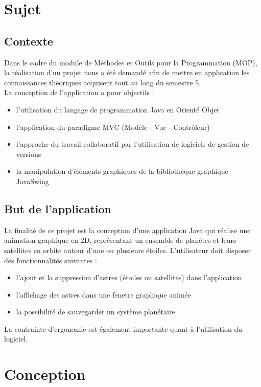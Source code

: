 \documentclass[a4paper,10pt]{article}
\begin{document}
\newpage
\tableofcontents
\newpage

\section{Sujet}
\subsection{Contexte}
Dans le cadre du module de Méthodes et Outils pour la Programmation (MOP), la réalisation d'un projet nous a été demandé afin de mettre
en application les connaissances théoriques acquisent tout au long du semestre 5. \\
La conception de l'application a pour objectifs :
\begin{itemize}
  \item l'utilisation du langage de programmation Java en Orienté Objet
  \item l'application du paradigme MVC (Modèle - Vue - Contrôleur)
  \item l'approche du travail collaboratif par l'utilisation de logiciels de gestion de versions
  \item la manipulation d'éléments graphiques de la bibliothèque graphique JavaSwing
\end{itemize}

\subsection{But de l'application}
La finalité de ce projet est la conception d'une application Java qui réalise une animation graphique en 2D, 
représentant un ensemble de planètes et leurs satellites en orbite autour d'une ou plusieurs étoiles.
L'utilisateur doit disposer des fonctionnalités suivantes :
\begin{itemize}
  \item l'ajout et la suppression d'astres (étoiles ou satellites) dans l'application
  \item l'affichage des astres dans une fenetre graphique animée
  \item la possibilité de sauvegarder un système planétaire 
\end{itemize}
La contrainte d'ergonomie est également importante quant à l'utilisation du logiciel.

\newpage
\section{Conception}
\end{document}

